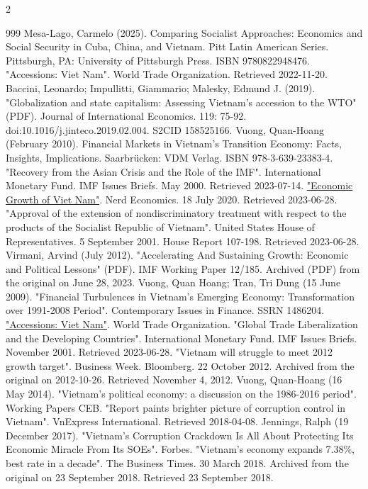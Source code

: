 \documentclass[openany]{book}
\begin{document}
\begin{multicols}{2}
\begin{thebibliography}{999}
 Mesa-Lago, Carmelo (2025). Comparing Socialist Approaches: Economics and Social Security in Cuba, China, and Vietnam. Pitt Latin American Series. Pittsburgh, PA: University of Pittsburgh Press. ISBN 9780822948476.
 "Accessions: Viet Nam". World Trade Organization. Retrieved 2022-11-20.
 Baccini, Leonardo; Impullitti, Giammario; Malesky, Edmund J. (2019). "Globalization and state capitalism: Assessing Vietnam's accession to the WTO" (PDF). Journal of International Economics. 119: 75-92. doi:10.1016/j.jinteco.2019.02.004. S2CID 158525166.
 Vuong, Quan-Hoang (February 2010). Financial Markets in Vietnam's Transition Economy: Facts, Insights, Implications. Saarbrücken: VDM Verlag. ISBN 978-3-639-23383-4.
 "Recovery from the Asian Crisis and the Role of the IMF". International Monetary Fund. IMF Issues Briefs. May 2000. Retrieved 2023-07-14.
 \href{https://sajjalokeshc1.com/2020/07/17/economic-growth-of-viet-nam/}{"Economic Growth of Viet Nam"}. Nerd Economics. 18 July 2020. Retrieved 2023-06-28.
 "Approval of the extension of nondiscriminatory treatment with respect to the products of the Socialist Republic of Vietnam". United States House of Representatives. 5 September 2001. House Report 107-198. Retrieved 2023-06-28.
 Virmani, Arvind (July 2012). "Accelerating And Sustaining Growth: Economic and Political Lessons" (PDF). IMF Working Paper 12/185. Archived (PDF) from the original on June 28, 2023.
 Vuong, Quan Hoang; Tran, Tri Dung (15 June 2009). "Financial Turbulences in Vietnam's Emerging Economy: Transformation over 1991-2008 Period". Contemporary Issues in Finance. SSRN 1486204.
 \href{https://www.wto.org/english/thewto_e/acc_e/a1_vietnam_e.htm}{"Accessions: Viet Nam"}. World Trade Organization.
 "Global Trade Liberalization and the Developing Countries". International Monetary Fund. IMF Issues Briefs. November 2001. Retrieved 2023-06-28.
 "Vietnam will struggle to meet 2012 growth target". Business Week. Bloomberg. 22 October 2012. Archived from the original on 2012-10-26. Retrieved November 4, 2012.
 Vuong, Quan-Hoang (16 May 2014). "Vietnam's political economy: a discussion on the 1986-2016 period". Working Papers CEB.
 "Report paints brighter picture of corruption control in Vietnam". VnExpress International. Retrieved 2018-04-08.
 Jennings, Ralph (19 December 2017). "Vietnam's Corruption Crackdown Is All About Protecting Its Economic Miracle From Its SOEs". Forbes.
 "Vietnam's economy expands 7.38\%, best rate in a decade". The Business Times. 30 March 2018. Archived from the original on 23 September 2018. Retrieved 23 September 2018.

\end{thebibliography}
\end{multicols}
\end{document}
